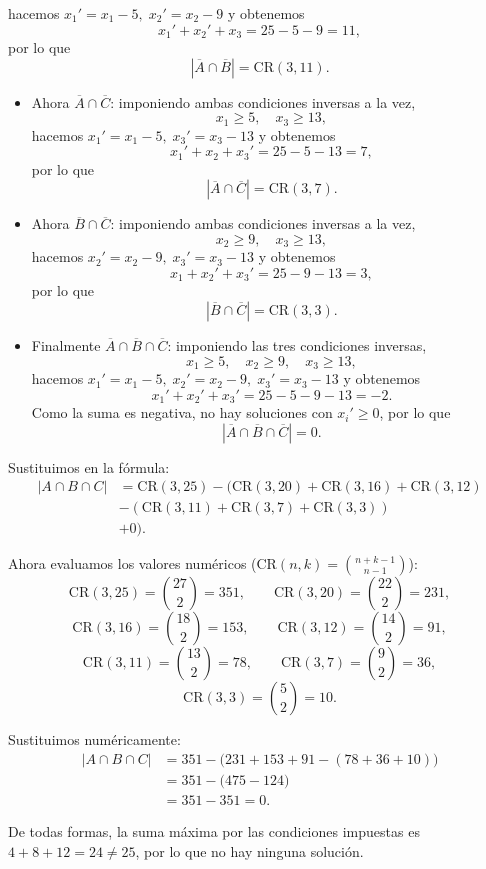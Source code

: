 \documentclass[a4paper,12pt]{article}
\begin{document}
\begin{ejercicio}[title=Ejercicio 31]
hacemos \(x_1' = x_1-5,\; x_2' = x_2-9\) y obtenemos
\[
x_1' + x_2' + x_3 = 25-5-9 = 11,
\]
por lo que
\[
|\overline{A}\cap\overline{B}| = \mathrm{CR}(3,11).
\]
\begin{itemize}

\item Ahora \(\overline{A}\cap\overline{C}\): imponiendo ambas condiciones inversas a la vez,
\[
x_1\ge 5,\quad x_3\ge 13,
\]
hacemos \(x_1' = x_1-5,\; x_3' = x_3-13\) y obtenemos
\[
x_1' + x_2 + x_3' = 25-5-13 = 7,
\]
por lo que
\[
|\overline{A}\cap\overline{C}| = \mathrm{CR}(3,7).
\]

\item Ahora \(\overline{B}\cap\overline{C}\): imponiendo ambas condiciones inversas a la vez,
\[
x_2\ge 9,\quad x_3\ge 13,
\]
hacemos \(x_2' = x_2-9,\; x_3' = x_3-13\) y obtenemos
\[
x_1 + x_2' + x_3' = 25-9-13 = 3,
\]
por lo que
\[
|\overline{B}\cap\overline{C}| = \mathrm{CR}(3,3).
\]

\item Finalmente \(\overline{A}\cap\overline{B}\cap\overline{C}\): imponiendo las tres condiciones inversas,
\[
x_1\ge 5,\quad x_2\ge 9,\quad x_3\ge 13,
\]
hacemos \(x_1' = x_1-5,\; x_2' = x_2-9,\; x_3' = x_3-13\) y obtenemos
\[
x_1' + x_2' + x_3' = 25-5-9-13 = -2.
\]
Como la suma es negativa, no hay soluciones con \(x_i'\ge 0\), por lo que
\[
|\overline{A}\cap\overline{B}\cap\overline{C}| = 0.
\]

\end{itemize}

Sustituimos en la fórmula:
\[
\begin{aligned}
|A\cap B \cap C|
&= \mathrm{CR}(3,25) - \Big(\mathrm{CR}(3,20) + \mathrm{CR}(3,16) + \mathrm{CR}(3,12) \\
&- (\mathrm{CR}(3,11) + \mathrm{CR}(3,7) + \mathrm{CR}(3,3)) \\
&+ 0\Big).
\end{aligned}
\]
\end{ejercicio}
\begin{ejercicio}[title=Ejercicio 31]

Ahora evaluamos los valores numéricos ($\mathrm{CR}(n,k)=\binom{n+k-1}{n-1}$):
\[
\mathrm{CR}(3,25)=\binom{27}{2}=351,\qquad
\mathrm{CR}(3,20)=\binom{22}{2}=231,
\]
\[
\mathrm{CR}(3,16)=\binom{18}{2}=153,\qquad
\mathrm{CR}(3,12)=\binom{14}{2}=91,
\]
\[
\mathrm{CR}(3,11)=\binom{13}{2}=78,\qquad
\mathrm{CR}(3,7)=\binom{9}{2}=36,
\]
\[
\mathrm{CR}(3,3)=\binom{5}{2}=10.
\]

Sustituimos numéricamente:
\[
\begin{aligned}
|A\cap B \cap C|
&= 351 - \Big(231 + 153 + 91 - (78 + 36 + 10)\Big) \\
&= 351 - \Big(475 - 124\Big) \\
&= 351 - 351 = \boxed{0}.
\end{aligned}
\]

De todas formas, la suma máxima por las condiciones impuestas es $4+8+12 = 24 \ne 25$, por lo que no hay ninguna solución.
\end{ejercicio}
\end{document}
